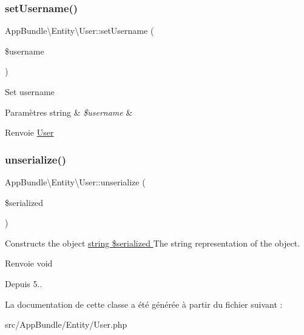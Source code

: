 \subsubsection{\texorpdfstring{set\+Username()}{setUsername()}}
{\footnotesize\ttfamily App\+Bundle\textbackslash{}\+Entity\textbackslash{}\+User\+::set\+Username (\begin{DoxyParamCaption}\item[{}]{\$username }\end{DoxyParamCaption})}

Set username


\begin{DoxyParams}[1]{Paramètres}
string & {\em \$username} & \\
\hline
\end{DoxyParams}
\begin{DoxyReturn}{Renvoie}
\hyperlink{classAppBundle_1_1Entity_1_1User}{User} 
\end{DoxyReturn}
\mbox{\label{classAppBundle_1_1Entity_1_1User_a35b5a8b6198e5c57b7cc176ba46c19d0}} 
\subsubsection{\texorpdfstring{unserialize()}{unserialize()}}
{\footnotesize\ttfamily App\+Bundle\textbackslash{}\+Entity\textbackslash{}\+User\+::unserialize (\begin{DoxyParamCaption}\item[{}]{\$serialized }\end{DoxyParamCaption})}

Constructs the object \hyperlink{}{string \$serialized } The string representation of the object. 

\begin{DoxyReturn}{Renvoie}
void 
\end{DoxyReturn}
\begin{DoxySince}{Depuis}
5.. 
\end{DoxySince}


La documentation de cette classe a été générée à partir du fichier suivant \+:\begin{DoxyCompactItemize}
\item 
src/\+App\+Bundle/\+Entity/User.\+php\end{DoxyCompactItemize}
